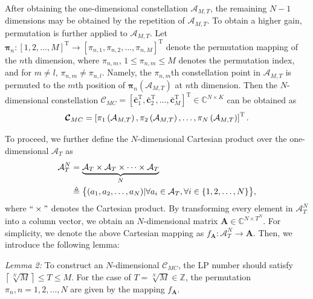 \documentclass[journal]{IEEEtran}
\begin{document}
After obtaining  the one-dimensional constellation  $\mathcal A _{{M,T}}$, the remaining $N-1$ dimensions may be  obtained by the  repetition of  $\mathcal A _{{M,T}}$.  To obtain  a higher  gain, permutation is further applied to  $\mathcal A _{{M,T}}$.  Let   $\boldsymbol {\pi }_{n}:[1,2,\ldots, M ]^{\text{T}} \rightarrow [\pi_{n,1},\pi_{n,2},\ldots, \pi_{n,M} ]^{\text{T}} $ denote  the permutation mapping of the $n$th dimension, where $\pi_{n,m}$, $1 \leq \pi_{n,m} \leq M  $ denotes the permutation index,   and for  $m \neq l$,  $   \pi_{n,m} \neq   \pi_{n,l}$. Namely,  the $\pi_{n,m}$th constellation point in  $\mathcal A _{{M,T}}$ is permuted to the $m$th position of $\boldsymbol {\pi }_{n}(\mathcal A _{{M,T}}) $ at $n$th dimension.  Then the $N$-dimensional constellation $ \boldsymbol {\mathcal C}_{MC} = \left[\mathbf {\bar{c}}_1^{\text{T}}, \mathbf {\bar{c}}_2^{\text{T}}, \ldots, \mathbf {\bar{c}}_M^{\text{T}} \right]^{\text{T}} \in \mathbb C^{N \times K}$ can be obtained as 
\begin{equation}
 \small
     \boldsymbol {\mathcal C}_{MC} = \left[ {\pi }_{1} \left( \mathcal A _{{M,T}} \right),{\pi }_{2} \left( \mathcal A _{{M,T}} \right),\ldots,{\pi }_{N} \left( \mathcal A _{{M,T}} \right)\right]^{\text{T}}.
\end{equation}

To proceed,  we further define the $N$-dimensional Cartesian product  over the  one-dimensional   $\mathcal A _{{T}}$ as 
\begin{equation}
\small
\begin{aligned}
   \mathcal A _{{T}}^{N} & = \underbrace{ \mathcal A _{{T}} \times \mathcal A _{{T}} \times \cdots \times \mathcal A _{{T}}}_{N}  \\ & \triangleq   
     \big\{(a_{1}, a_2, \ldots, a_N)   \vert 
    \forall  a_i  \in \mathcal A _{{T}}, \forall    i \in \{1,2,\ldots,N \} \big\},
\end{aligned}
\end{equation}
 where  $``\times" $  denotes the  Cartesian product. By transforming every  element in $\mathcal A _{{T}}^{N}$ into a column vector, we obtain an $N$-dimensional matrix $\mathbf A \in \mathbb C^{N \times T^N}$. For simplicity, we denote the above  Cartesian mapping as  $ f_{\mathbf A}:  \mathcal A _{{T}}^{N} \rightarrow \mathbf A $.  
Then, we introduce the following lemma:

{\textit{Lemma 2:}} To construct an $N$-dimensional  $  \boldsymbol {\mathcal C}_{MC}$, the LP number should satisfy $\left\lceil   {\sqrt[N]{M}}\right\rceil  \leq T \leq M$. For the case  of $ {T = \sqrt[N]{M}} \in \mathbb Z$, the permutation $\pi_n, n=1,2,\ldots,N$ are given by the    mapping   $ f_{\mathbf A}$.%
  
\end{document}
